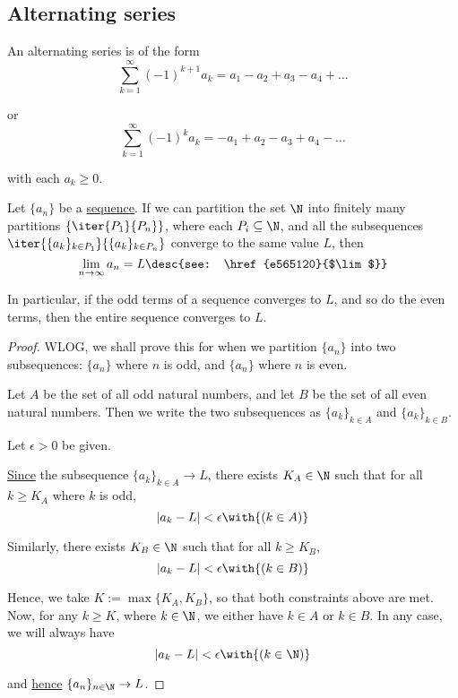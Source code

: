 \subsection{Alternating series}\label{e102e0b}

\label{b582bde}

An alternating series is of the form
$$
  \sum_{k=1}^\infty(-1)^{k+1}a_k=a_1-a_2+a_3-a_4+\ldots
$$

or
$$
  \sum_{k=1}^\infty(-1)^{k}a_k=-a_1+a_2-a_3+a_4-\ldots
$$

with each $a_k\geq0$.

\label{cca7bfc}

Let $\{a_n\}$ be a \href{b5fa0e4}{sequence}. If we can partition the set $\N$
into finitely many partitions $\{\iter{P_1}{P_n}\}$, where each
$P_i\subseteq\N$, and all the subsequences
$\iter{\{a_k\}_{k\in{P_1}}}{\{a_k\}_{k\in{P_n}}}$ converge to the same value
$L$, then
$$
  \lim_{n\to\infty}a_n=L\desc{see: \href{e565120}{$\lim$}}
$$

In particular, if the odd terms of a sequence converges to $L$, and so do the
even terms, then the entire sequence converges to $L$.

\begin{proof}
  WLOG, we shall prove this for when we partition $\{a_n\}$ into two
  subsequences: $\{a_n\}$ where $n$ is odd, and $\{a_n\}$ where $n$ is even.

  Let $A$ be the set of all odd natural numbers, and let $B$ be the set of all
  even natural numbers. Then we write the two subsequences as $\{a_k\}_{k\in
  A}$ and $\{a_k\}_{k\in B}$.

  Let $\epsilon>0$ be given.

  \href{e565120}{Since} the subsequence $\{a_k\}_{k\in A}\to L$, there exists
  $K_A\in\N$ such that for all $k\geq K_A$ where $k$ is odd,
  $$
    |a_k-L|<\epsilon\with{(k\in A)}
  $$

  Similarly, there exists $K_B\in\N$ such that for all $k\geq K_B$,
  $$
    |a_k-L|<\epsilon\with{(k\in B)}
  $$

  Hence, we take $K:=\max\{K_A,K_B\}$, so that both constraints above are met.
  Now, for any $k\geq K$, where $k\in\N$, we either have $k\in A$ or $k\in B$.
  In any case, we will always have
  $$
    |a_k-L|<\epsilon\with{(k\in\N)}
  $$

  and \href{e565120}{hence} $\{a_n\}_{n\in\N}\to L$.
\end{proof}

